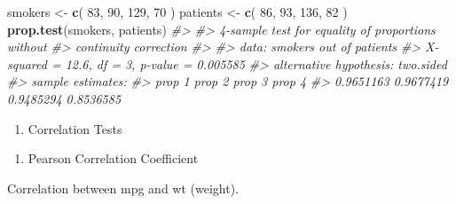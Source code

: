 \documentclass[
]{book}
\newenvironment{Shaded}{\begin{snugshade}}{\end{snugshade}}
\newcommand{\AttributeTok}[1]{\textcolor[rgb]{0.13,0.29,0.53}{#1}}
\newcommand{\CommentTok}[1]{\textcolor[rgb]{0.56,0.35,0.01}{\textit{#1}}}
\newcommand{\DecValTok}[1]{\textcolor[rgb]{0.00,0.00,0.81}{#1}}
\newcommand{\FunctionTok}[1]{\textcolor[rgb]{0.13,0.29,0.53}{\textbf{#1}}}
\newcommand{\NormalTok}[1]{#1}
\newcommand{\OtherTok}[1]{\textcolor[rgb]{0.56,0.35,0.01}{#1}}
\newcommand{\SpecialCharTok}[1]{\textcolor[rgb]{0.81,0.36,0.00}{\textbf{#1}}}
\newcommand{\StringTok}[1]{\textcolor[rgb]{0.31,0.60,0.02}{#1}}
\providecommand{\tightlist}{%
  \setlength{\itemsep}{0pt}\setlength{\parskip}{0pt}}
\begin{document}
\begin{Shaded}
\begin{Highlighting}[]
\NormalTok{smokers  }\OtherTok{\textless{}{-}} \FunctionTok{c}\NormalTok{( }\DecValTok{83}\NormalTok{, }\DecValTok{90}\NormalTok{, }\DecValTok{129}\NormalTok{, }\DecValTok{70}\NormalTok{ )}
\NormalTok{patients }\OtherTok{\textless{}{-}} \FunctionTok{c}\NormalTok{( }\DecValTok{86}\NormalTok{, }\DecValTok{93}\NormalTok{, }\DecValTok{136}\NormalTok{, }\DecValTok{82}\NormalTok{ )}
\FunctionTok{prop.test}\NormalTok{(smokers, patients)}
\CommentTok{\#\textgreater{} }
\CommentTok{\#\textgreater{}  4{-}sample test for equality of proportions without}
\CommentTok{\#\textgreater{}  continuity correction}
\CommentTok{\#\textgreater{} }
\CommentTok{\#\textgreater{} data:  smokers out of patients}
\CommentTok{\#\textgreater{} X{-}squared = 12.6, df = 3, p{-}value = 0.005585}
\CommentTok{\#\textgreater{} alternative hypothesis: two.sided}
\CommentTok{\#\textgreater{} sample estimates:}
\CommentTok{\#\textgreater{}    prop 1    prop 2    prop 3    prop 4 }
\CommentTok{\#\textgreater{} 0.9651163 0.9677419 0.9485294 0.8536585}
\end{Highlighting}
\end{Shaded}

\begin{enumerate}
\def\labelenumi{\arabic{enumi}.}
\setcounter{enumi}{3}
\tightlist
\item
  Correlation Tests
\end{enumerate}

\begin{enumerate}
\def\labelenumi{\alph{enumi}.}
\tightlist
\item
  Pearson Correlation Coefficient
\end{enumerate}

Correlation between mpg and wt (weight).

\begin{Shaded}
\end{Shaded}
\end{document}
